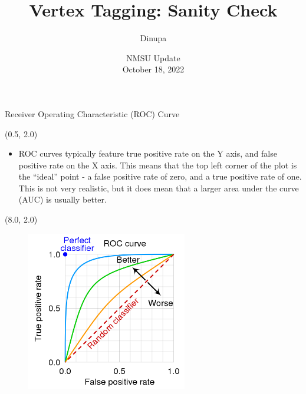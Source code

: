 \documentclass[12pt, xcolor={dvipsnames}, aspectratio = 169]{beamer}
\title{Vertex Tagging: Sanity Check}
\author{Dinupa}
\date{NMSU Update
\\ October 18, 2022 }
\begin{document}
\begin{frame}
    \maketitle
\end{frame}

\begin{frame}[fragile]{Receiver Operating Characteristic (ROC) Curve}

\begin{textblock}{7.0}(0.5, 2.0)
\begin{itemize}

    \item ROC curves typically feature true positive rate on the Y axis, and false positive rate on the X axis. This means that the top left corner of the plot is the “ideal” point - a false positive rate of zero, and a true positive rate of one. This is not very realistic, but it does mean that a larger area under the curve (AUC) is usually better.

\end{itemize}
\end{textblock}

\begin{textblock}{7.0}(8.0, 2.0)
\begin{figure}
    \centering
    \includegraphics[width=7.0cm]{../imgs/Roc_curve.png}
\end{figure}
\end{textblock}

\end{frame}
\end{document}
